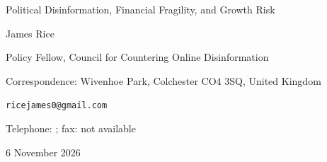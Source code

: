 \documentclass[11pt]{article}
\theoremstyle{definition}
\theoremstyle{remark}
\begin{document}
\hypersetup{pageanchor=false}
\begin{titlepage}
\begin{center}
\vspace*{0cm}

{\LARGE Political Disinformation, Financial Fragility,
and Growth Risk\par}

\vspace{0.5cm}
{\large James Rice\par}
{\normalsize Policy Fellow, Council for Countering Online Disinformation\par}
{\small Correspondence: Wivenhoe Park, Colchester CO4 3SQ, United Kingdom\par}
{\small \texttt{ricejames0@gmail.com}\par}
\ifdefined\SubmissionTelephone
{\small Telephone: \SubmissionTelephone; fax: not available\par}
\fi
\vspace{0.25cm}
{\small 6 November 2026\par}




\end{center}
\end{titlepage}
\end{document}
